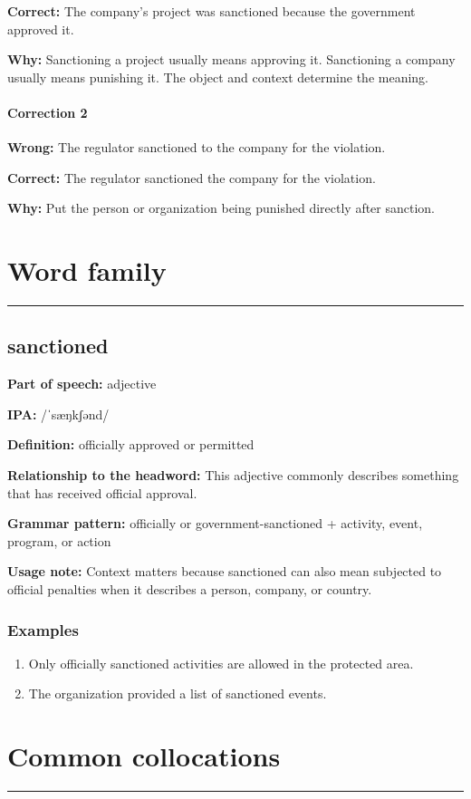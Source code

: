 \documentclass[11pt]{article}
\newcommand{\sectionrule}{\par\vspace{-0.5em}\noindent\textcolor{Accent}{\rule{\linewidth}{0.6pt}}\par}
\begin{document}
\textbf{Correct:} The company's project was sanctioned because the government approved it.

\textbf{Why:} Sanctioning a project usually means approving it. Sanctioning a company usually means punishing it. The object and context determine the meaning.

\paragraph{Correction 2}
\textbf{Wrong:} The regulator sanctioned to the company for the violation.

\textbf{Correct:} The regulator sanctioned the company for the violation.

\textbf{Why:} Put the person or organization being punished directly after sanction.

\section{Word family}
\sectionrule
\subsection{sanctioned}
\textbf{Part of speech:} adjective

\textbf{IPA:} /ˈsæŋkʃənd/

\textbf{Definition:} officially approved or permitted

\textbf{Relationship to the headword:} This adjective commonly describes something that has received official approval.

\textbf{Grammar pattern:} officially or government-sanctioned + activity, event, program, or action

\textbf{Usage note:} Context matters because sanctioned can also mean subjected to official penalties when it describes a person, company, or country.

\subsubsection{Examples}
\begin{enumerate}
  \item Only officially sanctioned activities are allowed in the protected area.
  \item The organization provided a list of sanctioned events.
\end{enumerate}

\section{Common collocations}
\sectionrule
\end{document}
